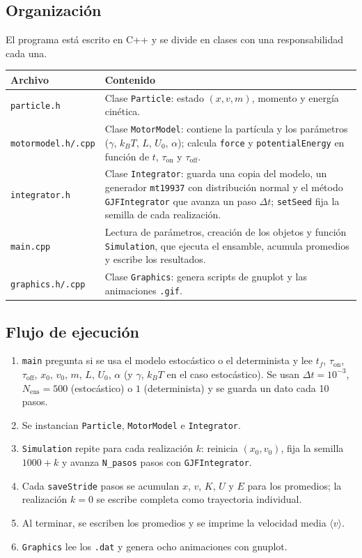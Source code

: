 \documentclass[11pt,a4paper]{article}
\begin{document}
\subsection{Organización}
El programa está escrito en C++ y se divide en clases con una responsabilidad cada una.

\begin{center}
\begin{tabular}{@{}l >{\raggedright\arraybackslash}p{10cm}@{}}
\toprule
Archivo & Contenido \\
\midrule
\texttt{particle.h} & Clase \texttt{Particle}: estado $(x,v,m)$, momento y energía cinética. \\
\texttt{motormodel.h/.cpp} & Clase \texttt{MotorModel}: contiene la partícula y los parámetros ($\gamma$, $k_BT$, $L$, $U_0$, $\alpha$); calcula \texttt{force} y \texttt{potentialEnergy} en función de $t$, $\tau_{\text{on}}$ y $\tau_{\text{off}}$. \\
\texttt{integrator.h} & Clase \texttt{Integrator}: guarda una copia del modelo, un generador \texttt{mt19937} con distribución normal y el método \texttt{GJFIntegrator} que avanza un paso $\Delta t$; \texttt{setSeed} fija la semilla de cada realización. \\
\texttt{main.cpp} & Lectura de parámetros, creación de los objetos y función \texttt{Simulation}, que ejecuta el ensamble, acumula promedios y escribe los resultados. \\
\texttt{graphics.h/.cpp} & Clase \texttt{Graphics}: genera scripts de gnuplot y las animaciones \texttt{.gif}. \\
\bottomrule
\end{tabular}
\end{center}

\subsection{Flujo de ejecución}
\begin{enumerate}
\item \texttt{main} pregunta si se usa el modelo estocástico o el determinista y lee $t_f$, $\tau_{\text{on}}$, $\tau_{\text{off}}$, $x_0$, $v_0$, $m$, $L$, $U_0$, $\alpha$ (y $\gamma$, $k_BT$ en el caso estocástico). Se usan $\Delta t=10^{-3}$, $N_{\text{ens}}=500$ (estocástico) o $1$ (determinista) y se guarda un dato cada 10 pasos.
\item Se instancian \texttt{Particle}, \texttt{MotorModel} e \texttt{Integrator}.
\item \texttt{Simulation} repite para cada realización $k$: reinicia $(x_0,v_0)$, fija la semilla $1000+k$ y avanza \texttt{N\_pasos} pasos con \texttt{GJFIntegrator}.
\item Cada \texttt{saveStride} pasos se acumulan $x$, $v$, $K$, $U$ y $E$ para los promedios; la realización $k=0$ se escribe completa como trayectoria individual.
\item Al terminar, se escriben los promedios y se imprime la velocidad media $\langle v\rangle$.
\item \texttt{Graphics} lee los \texttt{.dat} y genera ocho animaciones con gnuplot.
\end{enumerate}
\end{document}

